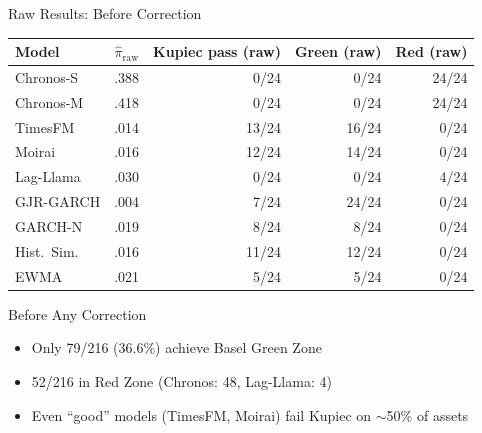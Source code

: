 \documentclass[9pt, aspectratio=169, t]{beamer}
\begin{document}
\begin{frame}{Raw Results: Before Correction}
	\vspace{-0.2cm}
	{\scriptsize
	\begin{center}
	\begin{tabular}{@{}l rr r r@{}}
	\toprule
	Model & $\hat\pi_{\mathrm{raw}}$ & Kupiec pass (raw) & Green (raw) & Red (raw) \\
	\midrule
	Chronos-S  & .388 &  0/24 &  0/24 & 24/24 \\
	Chronos-M  & .418 &  0/24 &  0/24 & 24/24 \\
	TimesFM    & .014 & 13/24 & 16/24 &  0/24 \\
	Moirai     & .016 & 12/24 & 14/24 &  0/24 \\
	Lag-Llama  & .030 &  0/24 &  0/24 &  4/24 \\
	\midrule
	GJR-GARCH  & .004 &  7/24 & 24/24 &  0/24 \\
	GARCH-N    & .019 &  8/24 &  8/24 &  0/24 \\
	Hist.\ Sim.& .016 & 11/24 & 12/24 &  0/24 \\
	EWMA       & .021 &  5/24 &  5/24 &  0/24 \\
	\bottomrule
	\end{tabular}
	\end{center}
	}
	\vspace{2mm}
	{\footnotesize
	\begin{alertblock}{Before Any Correction}
		\begin{itemize}\setlength{\itemsep}{2pt}
			\item Only 79/216 (36.6\%) achieve Basel Green Zone
			\item 52/216 in Red Zone (Chronos: 48, Lag-Llama: 4)
			\item Even ``good'' models (TimesFM, Moirai) fail Kupiec on $\sim$50\% of assets
		\end{itemize}
	\end{alertblock}
	}
\end{frame}
\end{document}
